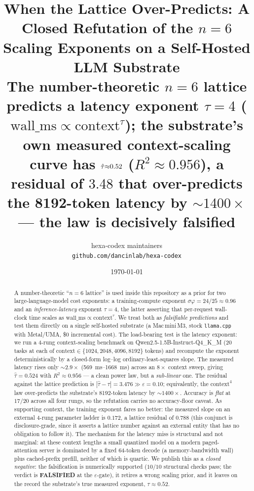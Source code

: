 \documentclass[11pt,a4paper]{article}
\title{
  \textbf{When the Lattice Over-Predicts: A Closed Refutation of the
  \(n{=}6\) Scaling Exponents on a Self-Hosted LLM Substrate}\\[4pt]
  \large The number-theoretic \(n{=}6\) lattice predicts a latency exponent
  \(\tau{=}4\) (\(\mathrm{wall\_ms}\propto\mathrm{context}^{\tau}\)); the
  substrate's own measured context-scaling curve has
  \(\taum{\approx}0.52\) (\(R^2{\approx}0.956\)), a residual of \(3.48\) that
  over-predicts the \num{8192}-token latency by \(\sim\!1400\times\) ---
  the law is decisively falsified
}
\author{hexa-codex maintainers \\ \texttt{github.com/dancinlab/hexa-codex}}
\date{\today}
\newcommand{\red}[1]{\textcolor{red!70!black}{\textbf{#1}}}
\newcommand{\taum}{\ensuremath{\hat{\tau}}}
\begin{document}
\maketitle

\begin{abstract}
A number-theoretic ``\(n{=}6\) lattice'' is used inside this repository as a
prior for two large-language-model cost exponents: a training-compute exponent
\(\sigma\varphi = 24/25 \approx 0.96\) and an \emph{inference-latency} exponent
\(\tau = 4\), the latter asserting that per-request wall-clock time scales as
\(\mathrm{wall\_ms} \propto \mathrm{context}^{\tau}\). We treat both as
\emph{falsifiable predictions} and test them directly on a single self-hosted
substrate (a Mac\,mini\,M3, stock \texttt{llama.cpp} with Metal/UMA, \$0
incremental cost). The load-bearing test is the latency exponent: we run a
4-rung context-scaling benchmark on Qwen2.5-1.5B-Instruct-Q4\_K\_M
(\(20\) tasks at each of \(\mathrm{context} \in \{1024, 2048, 4096, 8192\}\)
tokens) and recompute the exponent deterministically by a closed-form log--log
ordinary-least-squares slope. The measured latency rises only \(\sim\!2.9\times\)
(\SIrange{569}{1668}{\milli\second}) across an \(8\times\) context sweep, giving
\(\taum = 0.524\) with \(R^2 \approx 0.956\) --- a clean power law, but a
\emph{sub-linear} one. The residual against the lattice prediction is
\(|\taum - \tau| = 3.476 \gg \varepsilon = 0.10\); equivalently, the
\(\mathrm{context}^4\) law over-predicts the substrate's \num{8192}-token
latency by \(\sim\!1400\times\). Accuracy is \emph{flat} at \(17/20\) across all
four rungs, so the refutation carries no accuracy-floor caveat. As supporting
context, the training exponent fares no better: the measured slope on an
external 4-rung parameter ladder is \(0.172\), a lattice residual of \(0.788\)
(this conjunct is disclosure-grade, since it asserts a lattice number against an
external entity that has no obligation to follow it). The mechanism for the
latency miss is structural and not marginal: at these context lengths a small
quantized model on a modern paged-attention server is dominated by a fixed
64-token decode (a memory-bandwidth wall) plus cached-prefix prefill, neither
of which is quartic. We publish this as a \emph{closed negative}: the
falsification is numerically supported (\(10/10\) structural checks pass; the
verdict is \red{FALSIFIED} at the \(\varepsilon\)-gate), it retires a wrong
scaling prior, and it leaves on the record the substrate's true measured
exponent, \(\taum \approx 0.52\).
\end{abstract}
\end{document}
